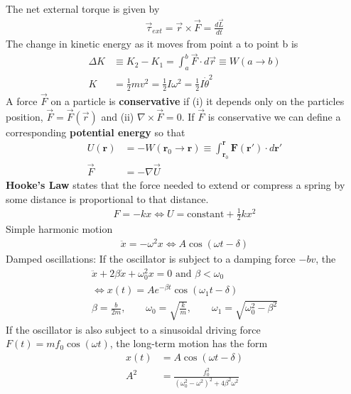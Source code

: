 \begin{multicols}{2}
The net external torque is given by
\begin{align}
\vec{\tau}_{ext} = \vec{r} \times \vec{F}= \frac{d\vec{L}}{dt}
\end{align}
The change in kinetic energy as it moves from point a to point b is
\begin{align}
\Delta K &\equiv K_2-K_1= \int_{a}^{b}\vec{F}\cdot d\vec{r} \equiv W(a \rightarrow b) \\
K &=\frac{1}{2}mv^2=\frac{1}{2}I\omega^2=\frac{1}{2}I\dot{\theta}^2
\end{align}
A force $\vec{F}$ on a particle is \textbf{conservative} if (i) it depends only on the particles position, $\vec{F}= \vec{F}(\vec{r})$ and (ii) $\nabla \times \vec{F} = 0$. If $\vec{F}$ is conservative we can define a corresponding \textbf{potential energy} so that
\begin{align}
U(\boldsymbol{r}) &= -W(\boldsymbol{r}_0 \rightarrow \boldsymbol{r}) \equiv \int_{\boldsymbol{r}_0}^{\boldsymbol{r}}\boldsymbol{F}(\boldsymbol{r} ')\cdot d\boldsymbol{r}' \\ 
\vec{F}&=-\nabla \vec{U}
\end{align}
\textbf{Hooke's Law} states that the force needed to extend or compress a spring by some distance is proportional to that distance.
\begin{align}
F=-kx \Longleftrightarrow U=\textrm{constant}+\frac{1}{2}kx^2
\end{align}	
Simple harmonic motion
\begin{align}
\ddot{x}=-\omega^2x \Longleftrightarrow A\cos(\omega t - \delta)
\end{align}
Damped oscillations: If the oscillator is subject to a damping force $-bv$, the
\begin{align}
\ddot{x}+2\beta\dot{x}+\omega_0^2x=0 \textrm{ and } \beta < \omega_0  \nonumber\\ \Longleftrightarrow x(t) =Ae^{-\beta t}\cos(\omega_1t-\delta) \\
\beta = \frac{b}{2m}, \textrm{ }\textrm{ }\textrm{ }
\omega_0 = \sqrt{\frac{k}{m}},\textrm{ }\textrm{ }\textrm{ }
\omega_1 = \sqrt{\omega_0^2-\beta^2}
\end{align}
If the oscillator is also subject to a sinusoidal driving force $F(t)=mf_0\cos(\omega t)$, the long-term motion has the form
\begin{align}
x(t)&=A\cos(\omega t-\delta) \\
A^2 &= \frac{f_0^2}{(\omega_0^2-\omega^2)^2+4\beta^2\omega^2}
\end{align}
\end{multicols}
